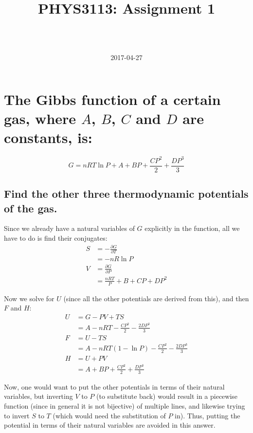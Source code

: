 \documentclass[a4paper]{scrartcl}
\begin{document}
\title{PHYS3113: Assignment 1}
\author{ \\ \\ }
\date{2017-04-27}
\maketitle

\section{The Gibbs function of a certain gas, where \(A\), \(B\), \(C\) and \(D\) are constants, is:}
\[G = n R T \ln P + A + B P + \frac{C P^2}{2} + \frac{D P^3}{3}\]

\subsection{Find the other three thermodynamic potentials of the gas.}
Since we already have a natural variables of \(G\) explicitly in the function, all we have to do is find their conjugates:
\begin{align*}
    S &= -\frac{\partial G}{\partial T} \\
    &= -n R \ln P \\
    V &= \frac{\partial G}{\partial P} \\
    &= \frac{n R T}{P} + B + C P + D P^2
\end{align*}

Now we solve for \(U\) (since all the other potentials are derived from this), and then \(F\) and \(H\):
\begin{align*}
    U &= G - P V + T S \\
    &= A - n R T - \frac{C P^2}{2} - \frac{2 D P^3}{3} \\
    F &= U - T S \\
    &= A - n R T (1 - \ln P) - \frac{C P^2}{2} - \frac{2 D P^3}{3} \\
    H &= U + P V \\
    &= A + B P + \frac{C P^2}{2} + \frac{D P^3}{3}
\end{align*}

Now, one would want to put the other potentials in terms of their natural variables, but inverting \(V\) to \(P\) (to substitute back) would result in a piecewise function (since in general it is not bijective) of multiple lines, and likewise trying to invert \(S\) to \(T\) (which would need the substitution of \(P\) in). Thus, putting the potential in terms of their natural variables are avoided in this answer.
\end{document}
